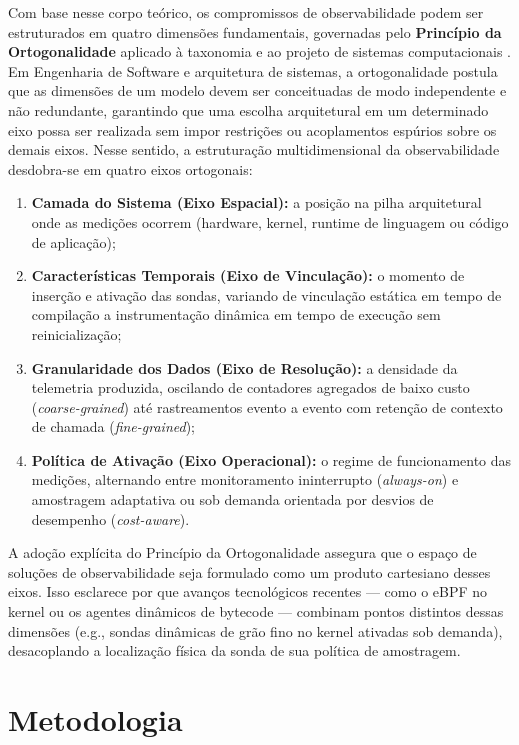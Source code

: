 \documentclass[sigconf, anonymous]{acmart}
\begin{document}
Com base nesse corpo teórico, os compromissos de observabilidade podem ser estruturados em quatro dimensões fundamentais, governadas pelo \textbf{Princípio da Ortogonalidade} aplicado à taxonomia e ao projeto de sistemas computacionais \cite{nickerson_2013}. Em Engenharia de Software e arquitetura de sistemas, a ortogonalidade postula que as dimensões de um modelo devem ser conceituadas de modo independente e não redundante, garantindo que uma escolha arquitetural em um determinado eixo possa ser realizada sem impor restrições ou acoplamentos espúrios sobre os demais eixos. Nesse sentido, a estruturação multidimensional da observabilidade desdobra-se em quatro eixos ortogonais:
\begin{enumerate}
    \item \textbf{Camada do Sistema (Eixo Espacial):} a posição na pilha arquitetural onde as medições ocorrem (hardware, kernel, runtime de linguagem ou código de aplicação);
    \item \textbf{Características Temporais (Eixo de Vinculação):} o momento de inserção e ativação das sondas, variando de vinculação estática em tempo de compilação a instrumentação dinâmica em tempo de execução sem reinicialização;
    \item \textbf{Granularidade dos Dados (Eixo de Resolução):} a densidade da telemetria produzida, oscilando de contadores agregados de baixo custo (\textit{coarse-grained}) até rastreamentos evento a evento com retenção de contexto de chamada (\textit{fine-grained});
    \item \textbf{Política de Ativação (Eixo Operacional):} o regime de funcionamento das medições, alternando entre monitoramento ininterrupto (\textit{always-on}) e amostragem adaptativa ou sob demanda orientada por desvios de desempenho (\textit{cost-aware}).
\end{enumerate}
A adoção explícita do Princípio da Ortogonalidade \cite{nickerson_2013} assegura que o espaço de soluções de observabilidade seja formulado como um produto cartesiano desses eixos. Isso esclarece por que avanços tecnológicos recentes — como o eBPF no kernel ou os agentes dinâmicos de bytecode — combinam pontos distintos dessas dimensões (e.g., sondas dinâmicas de grão fino no kernel ativadas sob demanda), desacoplando a localização física da sonda de sua política de amostragem.

\section{Metodologia}
\end{document}
